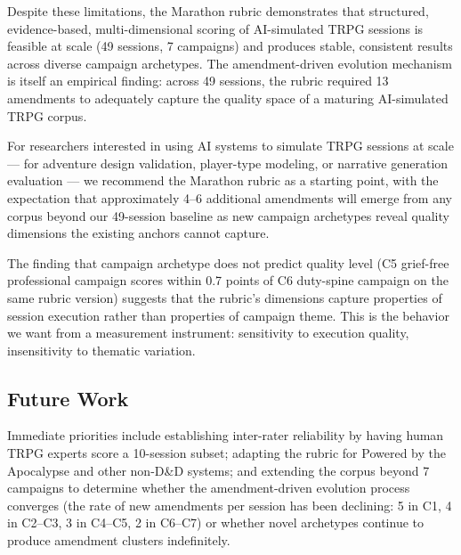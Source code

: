Despite these limitations, the Marathon rubric demonstrates that structured,
evidence-based, multi-dimensional scoring of AI-simulated TRPG sessions is feasible
at scale (49 sessions, 7 campaigns) and produces stable, consistent results across
diverse campaign archetypes. The amendment-driven evolution mechanism is itself an
empirical finding: across 49 sessions, the rubric required 13 amendments to adequately
capture the quality space of a maturing AI-simulated TRPG corpus.

For researchers interested in using AI systems to simulate TRPG sessions at scale ---
for adventure design validation, player-type modeling, or narrative generation evaluation
--- we recommend the Marathon rubric as a starting point, with the expectation that
approximately 4--6 additional amendments will emerge from any corpus beyond our 49-session
baseline as new campaign archetypes reveal quality dimensions the existing anchors
cannot capture.

The finding that campaign archetype does not predict quality level (C5 grief-free
professional campaign scores within 0.7 points of C6 duty-spine campaign on the same
rubric version) suggests that the rubric's dimensions capture properties of session
execution rather than properties of campaign theme. This is the behavior we want from
a measurement instrument: sensitivity to execution quality, insensitivity to thematic
variation.

\subsection{Future Work}

Immediate priorities include establishing inter-rater reliability by having human TRPG
experts score a 10-session subset; adapting the rubric for Powered by the Apocalypse
and other non-D\&D systems; and extending the corpus beyond 7 campaigns to determine
whether the amendment-driven evolution process converges (the rate of new amendments
per session has been declining: 5 in C1, 4 in C2--C3, 3 in C4--C5, 2 in C6--C7) or
whether novel archetypes continue to produce amendment clusters indefinitely.
